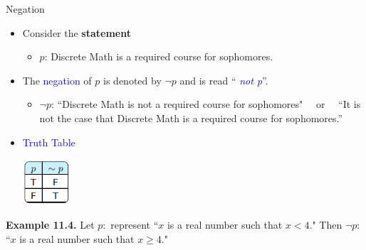 \documentclass[aspectratio=169]{beamer}
\providecommand{\Blue}[1]{\textcolor{blue}{#1}}
\begin{document}
\begin{frame}[plain]{Negation}

\begin{itemize}
 \item  Consider the {\bf statement}
    
    \begin{itemize}
       \item $p$:  Discrete Math is a required course for sophomores.
    \end{itemize}
 
 \item The \Blue{negation} of  $p$ is denoted by $\neg p$
 and is read ``\Blue{\emph{ not p}}''. 
   \begin{itemize}
       \item $\neg p$:  ``Discrete Math is not a required course for sophomores" 
        \ \  or \ \ ``It is not the case that Discrete Math is a required course for 
 sophomores.''
    \end{itemize}
 \pause 
    \item \Blue{Truth Table}
        \begin{center}
          \includegraphics[height=1.7cm]{./img/lecture11-fig2.png}
        \end{center}

\end{itemize}

{\bf Example 11.4.} Let $p:$ represent ``$x$ is a real number such that $x<4$." 
    Then $\neg p$: \pause ``$x$ is a real number such that $x\geq4$." 

\vspace{.5in}

\end{frame}
\end{document}
